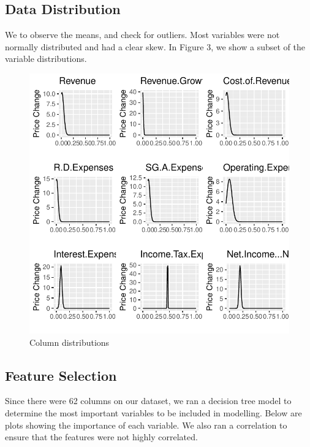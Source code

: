 \documentclass[11pt,]{article}
\begin{document}
\hypertarget{data-distribution}{%
\subsection{Data Distribution}\label{data-distribution}}

We to observe the means, and check for outliers. Most variables were not
normally distributed and had a clear skew. In Figure 3, we show a subset
of the variable distributions.

\begin{figure}

{\centering \includegraphics{stock_analysis_files/figure-latex/data normal distribution plot1-1} 

}

\caption{Column distributions}\label{fig:data normal distribution plot1}
\end{figure}

\hypertarget{feature-selection-1}{%
\subsection{Feature Selection}\label{feature-selection-1}}

Since there were 62 columns on our dataset, we ran a decision tree model
to determine the most important variables to be included in modelling.
Below are plots showing the importance of each variable. We also ran a
correlation to ensure that the features were not highly correlated.
\end{document}
